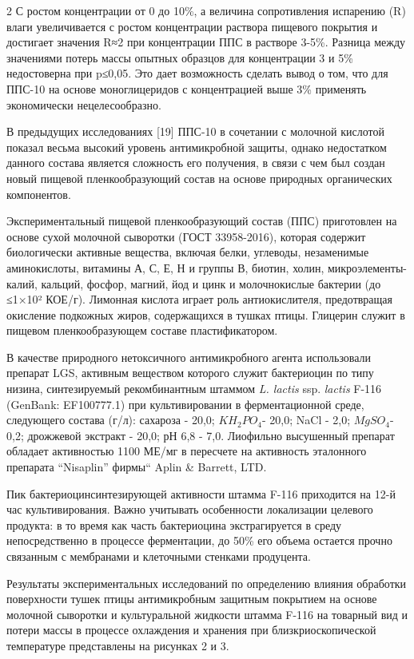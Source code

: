 \begin{multicols}{2}
С ростом концентрации от 0 до 10\%, а вели­чина сопротивления испарению
(R) влаги увеличивается с рос­том концентрации раствора пищевого покрытия
и достигает значения R≈2 при концентрации ППС в растворе 3-5\%. Разница
между значениями потерь массы опытных образцов для концентрации 3 и 5\%
недостоверна при p≤0,05. Это дает возможность сделать вывод о том, что
для ППС-10 на основе моноглицеридов с концентрацией выше 3\% применять
экономически нецелесообразно.

В предыдущих исследованиях {[}19{]} ППС-10 в сочетании с молочной
кислотой показал весьма высокий уровень антимикробной защиты, однако
недостатком данного состава является сложность его получения, в связи с
чем был создан новый пищевой пленкообразующий состав на основе природных
органических компонентов.

Экспериментальный пищевой пленкообразующий состав (ППС) приготовлен на
основе сухой молочной сыворотки (ГОСТ 33958-2016), которая содержит
биологически активные вещества, включая белки, углеводы, незаменимые
аминокислоты, витамины А, С, Е, Н и группы В, биотин, холин,
микроэлементы-калий, кальций, фосфор, магний, йод и цинк и молочнокислые
бактерии (до ≤1×10² КОЕ/г). Лимонная кислота играет роль антиокислителя,
предотвращая окисление подкожных жиров, содержащихся в тушках птицы.
Глицерин служит в пищевом пленкообразующем составе пластификатором.

В качестве природного нетоксичного антимикробного агента использовали
препарат LGS, активным веществом которого служит бактериоцин по
типу низина, синтезируемый рекомбинантным штаммом \emph{L. lactis} ssp.
\emph{lactis} F-116 (GenBank: EF100777.1) при культивировании в
ферментационной среде, следующего состава (г/л): сахароза - 20,0;
\(KH_{2}PO_{4}\)- 20,0; NaCl - 2,0; \(MgSO_{4}\)- 0,2; дрожжевой
экстракт - 20,0; рН 6,8 - 7,0. Лиофильно высушенный препарат обладает
активностью 1100 МЕ/мг в пересчете на активность эталонного препарата
``Nisaplin'' фирмы`` Aplin \& Barrett, LTD.

Пик бактериоцинсинтезирующей активности штамма F-116 приходится на 12-й
час культивирования. Важно учитывать особенности локализации целевого
продукта: в то время как часть бактериоцина экстрагируется в среду
непосредственно в процессе ферментации, до 50\% его объема остается
прочно связанным с мембранами и клеточными стенками продуцента.

Результаты экспериментальных исследований по определению влияния
обработки поверхности тушек птицы антимикробным защитным покрытием на
основе молочной сыворотки и культуральной жидкости штамма F-116 на
товарный вид и потери массы в процессе охлаждения и хранения при
близкриоскопической температуре представлены на рисунках 2 и 3.
\end{multicols}

